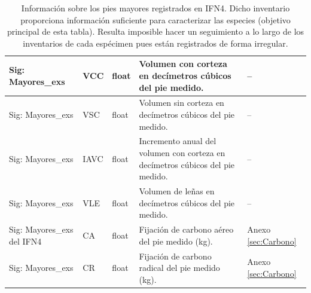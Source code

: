 \begin{table}[H]
{\begin{tabular}{|>{\centering\arraybackslash}m{1.8cm}|>{\centering\arraybackslash}m{3.5cm}|>{\centering\arraybackslash}m{2.5cm}|m{7cm}|>{\centering\arraybackslash}m{2cm}|}
\hline
Sig: Mayores\_exs & VCC & float & Volumen con corteza en decímetros cúbicos del pie medido. & -- \\
\hline
Sig: Mayores\_exs & VSC & float & Volumen sin corteza en decímetros cúbicos del pie medido. & -- \\
\hline
Sig: Mayores\_exs & IAVC & float & Incremento anual del volumen con corteza en decímetros cúbicos del pie medido. & -- \\
\hline
Sig: Mayores\_exs & VLE & float & Volumen de leñas en decímetros cúbicos del pie medido. & -- \\
\hline
Sig: Mayores\_exs del IFN4 & CA & float & Fijación de carbono aéreo del pie medido (kg). & Anexo \ref{sec:Carbono} \\
\hline
Sig: Mayores\_exs & CR & float & Fijación de carbono radical del pie medido (kg). & Anexo \ref{sec:Carbono} \\
\hline
\end{tabular}%
}
\caption{Información sobre los pies mayores registrados en IFN4. Dicho inventario proporciona información suficiente para caracterizar las especies (objetivo principal de esta tabla). Resulta imposible hacer un seguimiento a lo largo de los inventarios de cada espécimen pues están registrados de forma irregular.}
\label{tab:parcela_inventario_especie_arbol}
\end{table}





